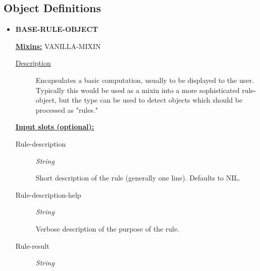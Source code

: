 \documentclass [11pt]{book}
\begin{document}
\label{sec:gendl(basecorekernelengine)nicknames:gdl,genworks,base}





\subsection{Object Definitions}

\label{subsec:objectdefinitions}



\begin{itemize}

\item {}
\textbf{BASE-RULE-OBJECT}


\textbf{
\underline{Mixins:}} VANILLA-MIXIN





\begin{description}

\item [
\underline{Description}]


Encapsulates a basic computation, usually to be displayed to the user.
Typically this would be used as a mixin into a more sophisticated rule-object, but the type can be
 used to detect objects which should be processed as "rules."



\end{description}








\textbf{
\underline{Input slots (optional):}}

\begin{description}

\item [Rule-description]
\emph{String}

 Short description of the rule (generally one line). Defaults to NIL.




\item [Rule-description-help]
\emph{String}

 Verbose description of the purpose of the rule.




\item [Rule-result]
\emph{String}


\end{description}
\end{itemize}
\end{document}
